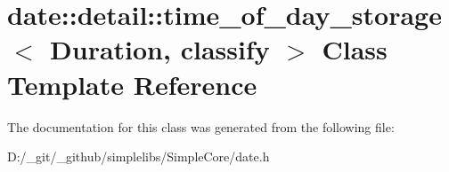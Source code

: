\hypertarget{classdate_1_1detail_1_1time__of__day__storage}{}\section{date\+::detail\+::time\+\_\+of\+\_\+day\+\_\+storage$<$ Duration, classify $>$ Class Template Reference}
\label{classdate_1_1detail_1_1time__of__day__storage}


The documentation for this class was generated from the following file\+:\begin{DoxyCompactItemize}
\item 
D\+:/\+\_\+git/\+\_\+github/simplelibs/\+Simple\+Core/date.\+h\end{DoxyCompactItemize}
